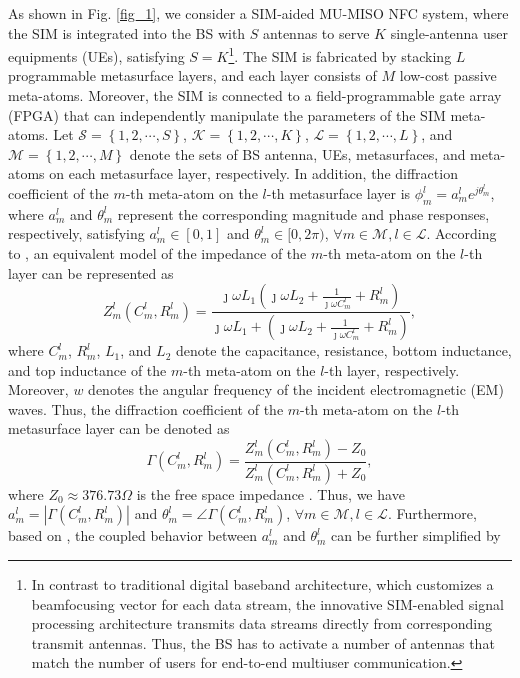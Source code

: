 \documentclass[conference]{IEEEtran}
\theoremstyle{remark}
\begin{document}
As shown in Fig. \ref{fig_1}, we consider a SIM-aided MU-MISO NFC system, where the SIM is integrated into the BS with $S$ antennas to serve $K$ single-antenna user equipments (UEs), satisfying $S=K$\footnote{In contrast to traditional digital baseband architecture, which customizes a beamfocusing vector for each data stream, the innovative SIM-enabled signal processing architecture transmits data streams directly from corresponding transmit antennas. Thus, the BS has to activate a number of antennas that match the number of users for end-to-end multiuser communication.}. The SIM is fabricated by stacking $L$ programmable metasurface layers, and each layer consists of $M$ low-cost passive meta-atoms. Moreover, the SIM is connected to a field-programmable gate array (FPGA) that can independently manipulate the parameters of the SIM meta-atoms. Let $\mathcal{S}= \left\{ 1, 2, \cdots, S\right\}$, $\mathcal{K}= \left\{ 1, 2, \cdots, K\right\}$, $\mathcal{L}= \left\{ 1, 2, \cdots, L\right\}$, and $\mathcal{M}= \left\{ 1, 2, \cdots, M\right\}$ denote the sets of BS antenna, UEs, metasurfaces, and meta-atoms on each metasurface layer, respectively. In addition, the diffraction coefficient of the $m$-th meta-atom on the $l$-th metasurface layer is ${\phi_{m}^{l}}=a_{m}^{l} e^{j{\theta}_{m}^{l}}$, where $a_{m}^{l}$ and ${\theta}_{m}^{l}$ represent the corresponding magnitude and phase responses, respectively, satisfying 
$a_{m}^{l}\in[0,1]$ and ${\theta}_{m}^{l}\in[0, 2\pi)$, $\forall m\in \mathcal{M}, l\in \mathcal{L}$. 
According to \cite{Ref_wu_Z0}, an equivalent model of the impedance of the $m$-th meta-atom on the $l$-th layer can be represented as
\begin{equation}
Z_{m}^{l}\left(C_{m}^{l}, R_{m}^{l}\right)=\frac{\jmath \omega L_{1}\left(\jmath \omega L_{2}+\frac{1}{\jmath \omega C_{m}^{l}}+R_{m}^{l}\right)}{\jmath \omega L_{1}+\left(\jmath \omega L_{2}+\frac{1}{\jmath \omega C_{m}^{l}}+R_{m}^{l}\right)},
\end{equation}
where $C_{m}^{l}$, $R_{m}^{l}$, $L_{1}$, and $L_{2}$ denote the capacitance, resistance, bottom inductance, and top inductance of the $m$-th meta-atom on the $l$-th layer, respectively. 
Moreover, $w$ denotes the angular frequency of the incident electromagnetic (EM) waves. 
Thus, the diffraction coefficient of the $m$-th meta-atom on the $l$-th metasurface layer can be denoted as
\begin{equation}
\Gamma\left(C_{m}^{l}, R_{m}^{l}\right)=\frac{Z_{m}^{l}\left(C_{m}^{l}, R_{m}^{l}\right)-Z_{0}}{Z_{m}^{l}\left(C_{m}^{l}, R_{m}^{l}\right)+Z_{0}},
\end{equation} where $Z_{0}\approx 376.73 \Omega$ is the free space impedance \cite{Ref_wu_Z0}. Thus, we have $a_{m}^{l}=\left | \Gamma\left(C_{m}^{l}, R_{m}^{l}\right) \right | $ and ${\theta}_{m}^{l}=\angle \Gamma\left(C_{m}^{l}, R_{m}^{l}\right)$, $\forall m\in \mathcal{M}, l\in \mathcal{L}$. Furthermore, based on \cite{Ref_wu_Z0}, the coupled behavior between $a_{m}^{l}$ and ${\theta}_{m}^{l}$ can be further simplified by
\end{document}
